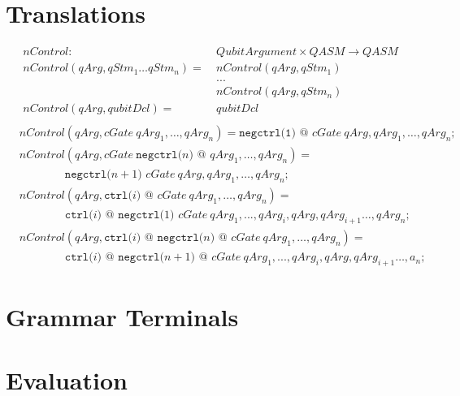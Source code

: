 \begin{appendices}
\chapter{Translations}
\label{appendix:translation}

\begin{align*}
    nControl : \ & QubitArgument \times QASM \to QASM\\
    nControl(qArg, qStm_1 \dots qStm_n) = \ & nControl(qArg, qStm_1)\\
        & ...\\
        & nControl(qArg, qStm_n)\\
    nControl(qArg, qubitDcl) = \ & qubitDcl\\
\end{align*}
\begin{align*}
    &nControl(qArg, cGate \ qArg_1, \dots, qArg_n ) =  \texttt{negctrl(1) @ } cGate \ qArg, qArg_1, \dots, qArg_n\texttt{;}\\
    &nControl(qArg, cGate \ \texttt{negctrl(}n\texttt{) @ } qArg_1, \dots, qArg_n ) = \\
    & \quad \quad \quad \quad \texttt{negctrl(}n + 1\texttt{) }cGate \ qArg, qArg_1, \dots, qArg_n\texttt{;}\\
    &nControl(qArg, \texttt{ctrl(}i \texttt{) @ } cGate \ qArg_1, \dots, qArg_n ) = \\
    & \quad \quad \quad \quad \texttt{ctrl(}i \texttt{) @ } \texttt{negctrl(}1\texttt{) } cGate \ qArg_1, ..., qArg_i, qArg, qArg_{i+1} \dots, qArg_n\texttt{;}\\
    &nControl(qArg, \texttt{ctrl(}i \texttt{) @ } \texttt{negctrl(}n\texttt{) @ } cGate \ qArg_1, \dots, qArg_n ) = \\
    & \quad \quad \quad \quad \texttt{ctrl(}i \texttt{) @ } \texttt{negctrl(}n + 1\texttt{) @ } cGate \ qArg_1, ..., qArg_i, qArg, qArg_{i+1} \dots, a_n\texttt{;}
\end{align*}

\chapter{Grammar Terminals}
\label{appendix:grammar_terminals}


\chapter{Evaluation}

\end{appendices}
